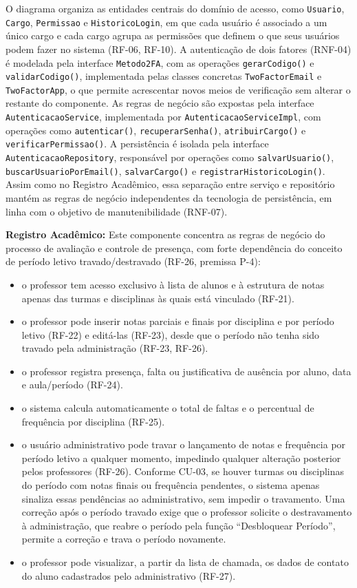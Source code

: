 O diagrama organiza as entidades
centrais do domínio de acesso, como \texttt{Usuario}, \texttt{Cargo},
\texttt{Permissao} e \texttt{HistoricoLogin}, em que cada usuário é associado a
um único cargo e cada cargo agrupa as permissões que definem o que seus
usuários podem fazer no sistema (RF-06, RF-10). A autenticação de dois fatores
(RNF-04) é modelada pela interface \texttt{Metodo2FA}, com as operações
\texttt{gerarCodigo()} e \texttt{validarCodigo()}, implementada pelas classes
concretas \texttt{TwoFactorEmail} e \texttt{TwoFactorApp}, o que permite
acrescentar novos meios de verificação sem alterar o restante do componente.
As regras de negócio são expostas pela interface \texttt{AutenticacaoService},
implementada por \texttt{AutenticacaoServiceImpl}, com operações como
\texttt{autenticar()}, \texttt{recuperarSenha()}, \texttt{atribuirCargo()} e
\texttt{verificarPermissao()}. A persistência é isolada pela interface
\texttt{Autenticacao\allowbreak Repository}, responsável por operações como
\texttt{salvarUsuario()}, \texttt{buscarUsuarioPorEmail()},
\texttt{salvarCargo()} e \texttt{registrarHistoricoLogin()}. Assim como no
Registro Acadêmico, essa separação entre serviço e repositório mantém as
regras de negócio independentes da tecnologia de persistência, em linha com o
objetivo de manutenibilidade (RNF-07).

\textbf{Registro Acadêmico:} Este componente concentra as
regras de negócio do processo de avaliação e controle de presença, com
forte dependência do conceito de período letivo travado/destravado
(RF-26, premissa P-4):
\begin{itemize}[nosep]
    \item o professor tem acesso exclusivo à lista de alunos e à estrutura
    de notas apenas das turmas e disciplinas às quais está vinculado
    (RF-21).
    \item o professor pode inserir notas parciais e finais por disciplina e
    por período letivo (RF-22) e editá-las (RF-23), desde que o período não
    tenha sido travado pela administração (RF-23, RF-26).
    \item o professor registra presença, falta ou justificativa de ausência
    por aluno, data e aula/período (RF-24).
    \item o sistema calcula automaticamente o total de faltas e o
    percentual de frequência por disciplina (RF-25).
    \item o usuário administrativo pode travar o lançamento de notas e
    frequência por período letivo a qualquer momento, impedindo qualquer
    alteração posterior pelos professores (RF-26). Conforme CU-03, se houver
    turmas ou disciplinas do período com notas finais ou frequência
    pendentes, o sistema apenas sinaliza essas pendências ao administrativo,
    sem impedir o travamento. Uma correção após o período travado exige que
    o professor solicite o destravamento à administração, que reabre o
    período pela função ``Desbloquear Período'', permite a correção e trava
    o período novamente.
    \item o professor pode visualizar, a partir da lista de chamada, os
    dados de contato do aluno cadastrados pelo administrativo (RF-27).
\end{itemize}

